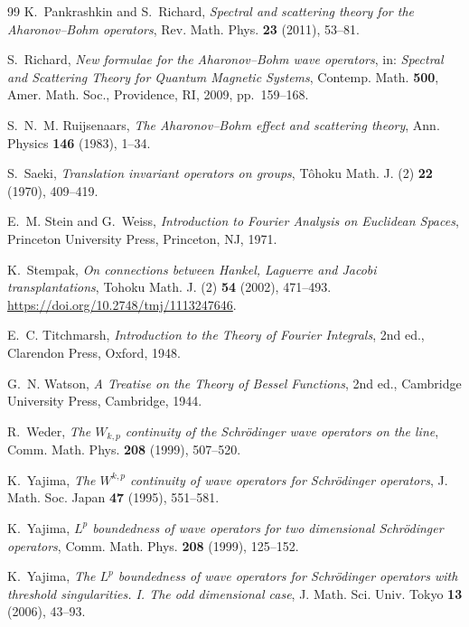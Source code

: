 \documentclass[11pt,a4paper,reqno,backref=page]{amsart}
\numberwithin{equation}{section}
\theoremstyle{definition}
\theoremstyle{remark}
\begin{document}
\begin{thebibliography}{99}
 K.~Pankrashkin and S.~Richard,
\emph{Spectral and scattering theory for the Aharonov--Bohm
operators}, Rev. Math. Phys. \textbf{23} (2011), 53--81.

 S.~Richard, \emph{New formulae for the
Aharonov--Bohm wave operators}, in: \emph{Spectral and
Scattering Theory for Quantum Magnetic Systems}, Contemp. Math.
\textbf{500}, Amer. Math. Soc., Providence, RI, 2009,
pp.~159--168.

 S.~N.~M. Ruijsenaars, \emph{The
Aharonov--Bohm effect and scattering theory}, Ann. Physics
\textbf{146} (1983), 1--34.

 S.~Saeki, \emph{Translation invariant
operators on groups}, T\^ohoku Math. J. (2) \textbf{22} (1970),
409--419.

 E.~M. Stein and G.~Weiss,
\emph{Introduction to Fourier Analysis on Euclidean Spaces},
Princeton University Press, Princeton, NJ, 1971.

 K.~Stempak, \emph{On connections between
Hankel, Laguerre and Jacobi transplantations}, Tohoku Math. J.
(2) \textbf{54} (2002), 471--493.
\url{https://doi.org/10.2748/tmj/1113247646}.

 E.~C. Titchmarsh, \emph{Introduction to
the Theory of Fourier Integrals}, 2nd ed., Clarendon Press,
Oxford, 1948.

 G.~N. Watson, \emph{A Treatise on the
Theory of Bessel Functions}, 2nd ed., Cambridge University
Press, Cambridge, 1944.

 R.~Weder, \emph{The $W_{k,p}$ continuity of
the Schr\"odinger wave operators on the line}, Comm. Math. Phys.
\textbf{208} (1999), 507--520.

 K.~Yajima, \emph{The $W^{k,p}$ continuity
of wave operators for Schr\"odinger operators}, J. Math. Soc.
Japan \textbf{47} (1995), 551--581.

 K.~Yajima, \emph{$L^p$ boundedness of wave
operators for two dimensional Schr\"odinger operators}, Comm.
Math. Phys. \textbf{208} (1999), 125--152.

 K.~Yajima, \emph{The $L^p$ boundedness of
wave operators for Schr\"odinger operators with threshold
singularities. I. The odd dimensional case}, J. Math. Sci. Univ.
Tokyo \textbf{13} (2006), 43--93.

\end{thebibliography}
\endgroup
\end{document}
